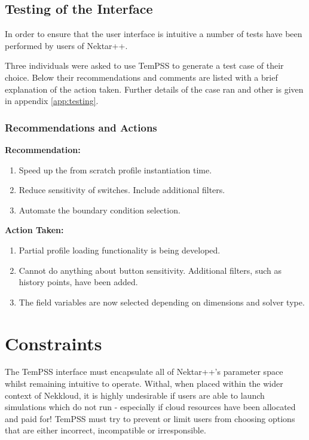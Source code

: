 \documentclass[11pt, a4paper]{report}
\begin{document}
\section{Testing of the Interface}
In order to ensure that the user interface is intuitive a number of tests have been performed by users of Nektar++.

Three individuals were asked to use TemPSS to generate a test case of their choice. Below their recommendations and comments are listed with a brief explanation of the action taken. Further details of the case ran and other is given in appendix \ref{app:testing}.

\subsection{Recommendations and Actions}
\begin{multicols}{2}

\textbf{Recommendation:}
\begin{enumerate}
\item Speed up the from scratch profile instantiation time.
\item Reduce sensitivity of switches. Include additional filters.\\ 
\item Automate the boundary condition selection.\\
\end{enumerate}

\columnbreak

\textbf{Action Taken:}
\begin{enumerate}
\item Partial profile loading functionality is being developed.
\item Cannot do anything about button sensitivity. Additional filters, such as history points, have been added.
\item The field variables are now selected depending on dimensions and solver type.
\end{enumerate}

\end{multicols}

\chapter{Constraints}
\label{sec:constraints}
The TemPSS interface must encapsulate all of Nektar++'s parameter space whilst remaining intuitive to operate. Withal, when placed within the wider context of Nekkloud, it is highly undesirable if users are able to launch simulations which do not run - especially if cloud resources have been allocated and paid for! TemPSS must try to prevent or limit users from choosing options that are either incorrect, incompatible or irresponsible.
\end{document}
